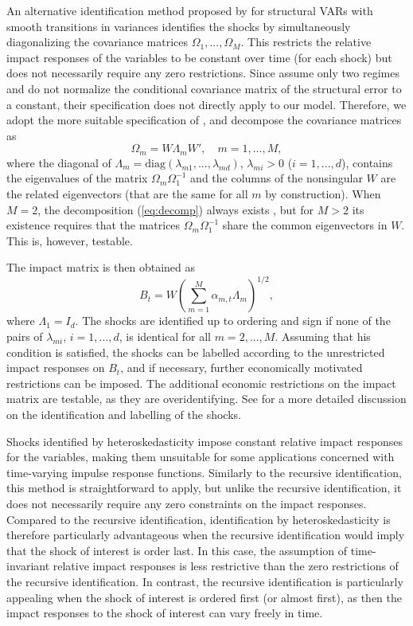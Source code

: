 \documentclass[nojss]{jss}
\begin{document}
An alternative identification method proposed by \cite{Lutkepohl+Netsunajev:2017} for structural VARs with smooth transitions in variances \citep[see also the seminal paper by][]{Rigobon:2003} identifies the shocks by simultaneously diagonalizing the covariance matrices $\Omega_1,...,\Omega_M$. This restricts the relative impact responses of the variables to be constant over time (for each shock) but does not necessarily require any zero restrictions. Since \cite{Lutkepohl+Netsunajev:2017} assume only two regimes and do not normalize the conditional covariance matrix of the structural error to a constant, their specification does not directly apply to our model. Therefore, we adopt the more suitable specification of \cite{Virolainen:2025}, and decompose the covariance matrices as
\begin{equation}\label{eq:decomp}
\Omega_m=W\Lambda_mW', \quad m=1,...,M,
\end{equation}
where the diagonal of $\Lambda_m=\text{diag}(\lambda_{m1},...,\lambda_{md})$, $\lambda_{mi}>0$ ($i=1,...,d$), contains the eigenvalues of the matrix $\Omega_m\Omega_1^{-1}$ and the columns of the nonsingular $W$ are the related eigenvectors (that are the same for all $m$ by construction). When $M=2$, the decomposition (\ref{eq:decomp}) always exists \citep[Theorem A9.9]{Muirhead:1982}, but for $M>2$ its existence requires that the matrices $\Omega_m\Omega_1^{-1}$ share the common eigenvectors in $W$. This is, however, testable.

The impact matrix is then obtained as
\begin{equation}
B_t=W\left(\sum_{m=1}^M\alpha_{m,t}\Lambda_m\right)^{1/2},
\end{equation}
where $\Lambda_1=I_d$. The shocks are identified up to ordering and sign if none of the pairs of $\lambda_{mi}$, $i=1,...,d$, is identical for all $m=2,...,M$. Assuming that his condition is satisfied, the shocks can be labelled according to the unrestricted impact responses on $B_t$, and if necessary, further economically motivated restrictions can be imposed. The additional economic restrictions on the impact matrix are testable, as they are overidentifying. See \cite{Virolainen:2025} for a more detailed discussion on the identification and labelling of the shocks.

Shocks identified by heteroskedasticity impose constant relative impact responses for the variables, making them unsuitable for some applications concerned with time-varying impulse response functions. Similarly to the recursive identification, this method is straightforward to apply, but unlike the recursive identification, it does not necessarily require any zero constraints on the impact responses. Compared to the recursive identification, identification by heteroskedasticity is therefore particularly advantageous when the recursive identification would imply that the shock of interest is order last. In this case, the assumption of time-invariant relative impact responses is less restrictive than the zero restrictions of the recursive identification. In contrast, the recursive identification is particularly appealing when the shock of interest is ordered first (or almost first), as then the impact responses to the shock of interest can vary freely in time.
\end{document}
